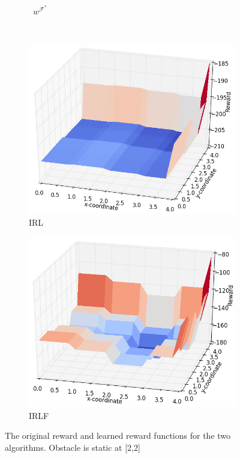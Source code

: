 \documentclass[a4paper,11pt]{report}
\begin{document}
\begin{figure}[thb]
\begin{subfigure}[b]{0.42\columnwidth}
    
    \caption{\ $w^{\mathcal{F}^*}$}
    \label{fig:rf_plot_bad}
  \end{subfigure}  
  \\
  \label{fig:contrastive}
  \begin{subfigure}[b]{0.42\columnwidth}
    \includegraphics[clip=true,width=\textwidth]{figures/RF_IRL.png}
    \caption{IRL}
    \label{fig:rf_plot_irl}
  \end{subfigure}
  \begin{subfigure}[b]{0.42\columnwidth}

    \includegraphics[clip=true,width=\textwidth]{figures/RF_IRLF.png}
    \caption{IRLF}
    \label{fig:rf_plot_irlf}
  \end{subfigure}  
  \caption{The original reward and learned reward functions for the two algorithms. Obstacle is static at [2,2]\ }
  \label{fig:rf_plot}
\end{figure}
\end{document}
